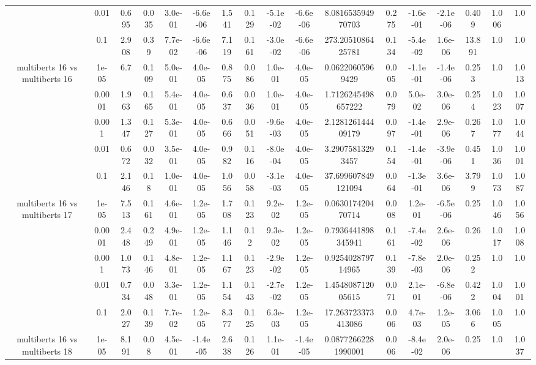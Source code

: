 \begin{tabular}{|c|c|c|c|c|c|c|c|c|c|c|c|c|c|c|c|c|}
 & 0.01 & 0.695 & 0.035 & 3.0e-01 & -6.6e-06 & 1.541 & 0.129 & -5.1e-02 & -6.6e-06 & 8.081653594970703 & 0.275 & -1.6e-01 & -2.1e-06 & 0.409 & 1.006 & 1.0 \\
 & 0.1 & 2.908 & 0.39 & 7.7e-02 & -6.6e-06 & 7.119 & 0.161 & -3.0e-02 & -6.6e-06 & 273.2051086425781 & 0.134 & -5.4e-02 & 1.6e-06 & 13.891 & 1.0 & 1.0 \\
\hline
\multirow{5}{*}{multiberts 16 vs multiberts 16} & 1e-05 & 6.7 & 0.109 & 5.0e-01 & 4.0e-05 & 0.875 & 0.086 & 1.0e-01 & 4.0e-05 & 0.06220605969429 & 0.005 & -1.1e-01 & -1.4e-06 & 0.253 & 1.0 & 1.013 \\
 & 0.0001 & 1.963 & 0.165 & 5.4e-01 & 4.0e-05 & 0.637 & 0.036 & 1.0e-01 & 4.0e-05 & 1.7126245498657222 & 0.079 & 5.0e-02 & 3.0e-06 & 0.254 & 1.023 & 1.007 \\
 & 0.001 & 1.347 & 0.127 & 5.3e-01 & 4.0e-05 & 0.666 & 0.051 & -9.6e-03 & 4.0e-05 & 2.128126144409179 & 0.097 & -1.4e-01 & 2.9e-06 & 0.267 & 1.077 & 1.044 \\
 & 0.01 & 0.672 & 0.032 & 3.5e-01 & 4.0e-05 & 0.982 & 0.116 & -8.0e-04 & 4.0e-05 & 3.29075813293457 & 0.154 & -1.4e-01 & -3.9e-06 & 0.451 & 1.036 & 1.001 \\
 & 0.1 & 2.146 & 0.18 & 1.0e-01 & 4.0e-05 & 1.056 & 0.058 & -3.1e-03 & 4.0e-05 & 37.699607849121094 & 0.064 & -1.3e-01 & 3.6e-06 & 3.799 & 1.073 & 1.087 \\
\hline
\multirow{5}{*}{multiberts 16 vs multiberts 17} & 1e-05 & 7.513 & 0.161 & 4.6e-01 & 1.2e-05 & 1.708 & 0.123 & 9.2e-02 & 1.2e-05 & 0.063017420470714 & 0.008 & 1.2e-01 & -6.5e-06 & 0.25 & 1.046 & 1.056 \\
 & 0.0001 & 2.448 & 0.249 & 4.9e-01 & 1.2e-05 & 1.146 & 0.12 & 9.3e-02 & 1.2e-05 & 0.7936441898345941 & 0.161 & -7.4e-02 & 2.6e-06 & 0.26 & 1.017 & 1.008 \\
 & 0.001 & 1.073 & 0.146 & 4.8e-01 & 1.2e-05 & 1.167 & 0.123 & -2.9e-02 & 1.2e-05 & 0.925402879714965 & 0.139 & -7.8e-03 & 2.0e-06 & 0.252 & 1.0 & 1.0 \\
 & 0.01 & 0.734 & 0.048 & 3.3e-01 & 1.2e-05 & 1.154 & 0.143 & -2.7e-02 & 1.2e-05 & 1.454808712005615 & 0.071 & 2.1e-01 & -6.8e-06 & 0.422 & 1.004 & 1.001 \\
 & 0.1 & 2.027 & 0.139 & 7.7e-02 & 1.2e-05 & 8.377 & 0.125 & 6.3e-03 & 1.2e-05 & 17.263723373413086 & 0.006 & 4.7e-03 & 1.2e-05 & 3.066 & 1.005 & 1.0 \\
\hline
\multirow{5}{*}{multiberts 16 vs multiberts 18} & 1e-05 & 8.191 & 0.08 & 4.5e-01 & -1.4e-05 & 2.638 & 0.126 & 1.1e-01 & -1.4e-05 & 0.08772662281990001 & 0.006 & -8.4e-02 & 2.0e-06 & 0.25 & 1.0 & 1.037 \\

\end{tabular}
